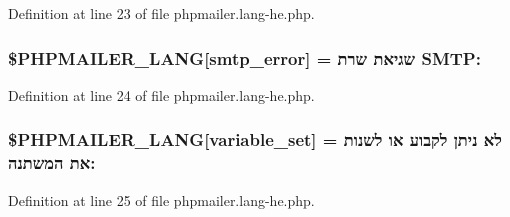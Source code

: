 Definition at line 23 of file phpmailer.\+lang-\/he.\+php.

\subsubsection[{\texorpdfstring{\$\+P\+H\+P\+M\+A\+I\+L\+E\+R\+\_\+\+L\+A\+NG}{$PHPMAILER_LANG}}]{\setlength{\rightskip}{0pt plus 5cm}\$P\+H\+P\+M\+A\+I\+L\+E\+R\+\_\+\+L\+A\+NG\mbox{[}\textquotesingle{}smtp\+\_\+error\textquotesingle{}\mbox{]} = \textquotesingle{}שגיאת שרת S\+M\+T\+P\+: \textquotesingle{}}\hypertarget{phpmailer_8lang-he_8php_a7d9cffba1e669c845f8a4c891ee50064}{}\label{phpmailer_8lang-he_8php_a7d9cffba1e669c845f8a4c891ee50064}


Definition at line 24 of file phpmailer.\+lang-\/he.\+php.

\subsubsection[{\texorpdfstring{\$\+P\+H\+P\+M\+A\+I\+L\+E\+R\+\_\+\+L\+A\+NG}{$PHPMAILER_LANG}}]{\setlength{\rightskip}{0pt plus 5cm}\$P\+H\+P\+M\+A\+I\+L\+E\+R\+\_\+\+L\+A\+NG\mbox{[}\textquotesingle{}variable\+\_\+set\textquotesingle{}\mbox{]} = \textquotesingle{}לא ניתן לקבוע או לשנות את המשתנה\+: \textquotesingle{}}\hypertarget{phpmailer_8lang-he_8php_af795debc7a739d038742691c358d9032}{}\label{phpmailer_8lang-he_8php_af795debc7a739d038742691c358d9032}


Definition at line 25 of file phpmailer.\+lang-\/he.\+php.

